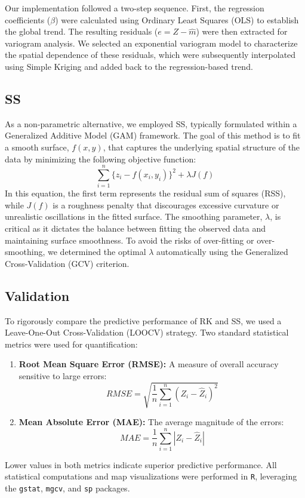 \documentclass[twoside]{article}
\begin{document}
Our implementation followed a two-step sequence. First, the regression coefficients ($\beta$) were calculated using Ordinary Least Squares (OLS) to establish the global trend. The resulting residuals ($e = Z - \hat{m}$) were then extracted for variogram analysis. We selected an exponential variogram model to characterize the spatial dependence of these residuals, which were subsequently interpolated using Simple Kriging and added back to the regression-based trend.
\subsection{SS}
As a non-parametric alternative, we employed SS, typically formulated within a Generalized Additive Model (GAM) framework. The goal of this method is to fit a smooth surface, $f(x,y)$, that captures the underlying spatial structure of the data by minimizing the following objective function:
\begin{equation}
\sum_{i=1}^n \{z_i - f(x_i, y_i)\}^2 + \lambda J(f)
\end{equation}
In this equation, the first term represents the residual sum of squares (RSS), while $J(f)$ is a roughness penalty that discourages excessive curvature or unrealistic oscillations in the fitted surface. The smoothing parameter, $\lambda$, is critical as it dictates the balance between fitting the observed data and maintaining surface smoothness. To avoid the risks of over-fitting or over-smoothing, we determined the optimal $\lambda$ automatically using the Generalized Cross-Validation (GCV) criterion.
\subsection{Validation}
To rigorously compare the predictive performance of RK and SS, we used a Leave-One-Out Cross-Validation (LOOCV) strategy. Two standard statistical metrics were used for quantification:

\begin{enumerate}
    \item \textbf{Root Mean Square Error (RMSE):} A measure of overall accuracy sensitive to large errors:
    \begin{equation}
    RMSE = \sqrt{\frac{1}{n} \sum_{i=1}^{n} (Z_i - \hat{Z}_i)^2}
    \end{equation}
    \item \textbf{Mean Absolute Error (MAE):} The average magnitude of the errors:
    \begin{equation}
    MAE = \frac{1}{n} \sum_{i=1}^{n} |Z_i - \hat{Z}_i|
    \end{equation}
\end{enumerate}
Lower values in both metrics indicate superior predictive performance. All statistical computations and map visualizations were performed in \texttt{R}, leveraging the \texttt{gstat}, \texttt{mgcv}, and \texttt{sp} packages.
\end{document}

